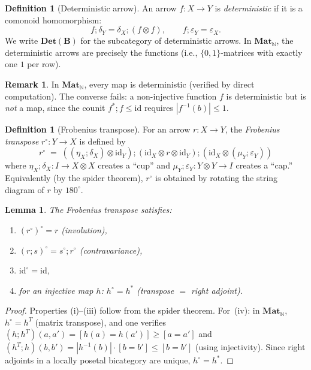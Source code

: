 \documentclass[11pt,a4paper]{article}
\newtheorem{lemma}[theorem]{Lemma}
\theoremstyle{definition}
\newtheorem{definition}[theorem]{Definition}
\newtheorem{remark}[theorem]{Remark}
\newcommand{\op}{{\circ}}
\newcommand{\Mat}{\mathbf{Mat}}
\newcommand{\Det}{\mathbf{Det}}
\newcommand{\N}{\mathbb{N}}
\newcommand{\id}{\mathrm{id}}
\begin{document}
\begin{definition}[Deterministic arrow]\label{def:det}
An arrow $f \colon X \to Y$ is \emph{deterministic} if it is a comonoid homomorphism:
\[
  f;\delta_Y = \delta_X;(f \otimes f), \qquad f;\varepsilon_Y = \varepsilon_X.
\]
We write $\Det(\mathbf{B})$ for the subcategory of deterministic arrows. In $\Mat_\N$, the deterministic arrows are precisely the functions (i.e., $\{0,1\}$-matrices with exactly one $1$ per row).
\end{definition}

\begin{remark}\label{rmk:det-vs-map}
In $\Mat_\N$, every map is deterministic (verified by direct computation). The converse fails: a non-injective function $f$ is deterministic but is \emph{not} a map, since the counit $f^*;f \leq \id$ requires $|f^{-1}(b)| \leq 1$.
\end{remark}

\begin{definition}[Frobenius transpose]\label{def:transpose}
For an arrow $r \colon X \to Y$, the \emph{Frobenius transpose} $r^\op \colon Y \to X$ is defined by
\[
  r^\op \;=\; ((\eta_X;\delta_X) \otimes \id_Y);(\id_X \otimes r \otimes \id_Y);(\id_X \otimes (\mu_Y;\varepsilon_Y))
\]
where $\eta_X;\delta_X \colon I \to X \otimes X$ creates a ``cup'' and $\mu_Y;\varepsilon_Y \colon Y \otimes Y \to I$ creates a ``cap.'' Equivalently (by the spider theorem), $r^\op$ is obtained by rotating the string diagram of $r$ by $180^\circ$.
\end{definition}

\begin{lemma}\label{lem:transpose-props}
The Frobenius transpose satisfies:
\begin{enumerate}[label=(\roman*)]
  \item $(r^\op)^\op = r$ \quad \textup{(involution)},
  \item $(r;s)^\op = s^\op; r^\op$ \quad \textup{(contravariance)},
  \item $\id^\op = \id$,
  \item for an injective map $h$: $h^\op = h^*$ \quad \textup{(transpose $=$ right adjoint)}.
\end{enumerate}
\end{lemma}

\begin{proof}
Properties (i)--(iii) follow from the spider theorem. For~(iv): in $\Mat_\N$, $h^\op = h^T$ (matrix transpose), and one verifies $(h;h^T)(a,a') = [h(a){=}h(a')] \geq [a{=}a']$ and $(h^T;h)(b,b') = |h^{-1}(b)| \cdot [b{=}b'] \leq [b{=}b']$ (using injectivity). Since right adjoints in a locally posetal bicategory are unique, $h^\op = h^*$.
\end{proof}
\end{document}
